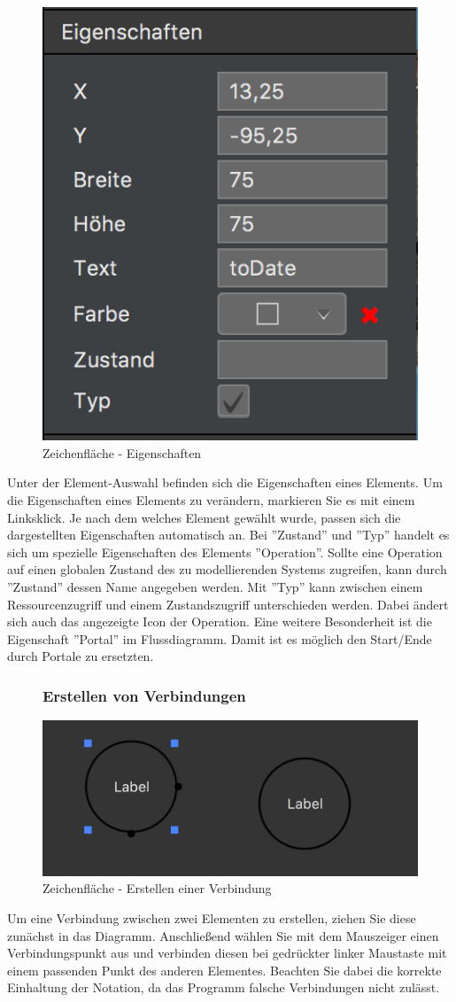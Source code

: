 \pagebreak
\begin{figure}[H]
	\centering
	\includegraphics[width=.4\textwidth]{Eigenschaften.png}
	\caption{Zeichenfläche - Eigenschaften}
\end{figure}
Unter der Element-Auswahl befinden sich die Eigenschaften eines Elements. Um die Eigenschaften eines Elements zu verändern, markieren Sie es mit einem Linksklick. Je nach dem welches Element gewählt wurde, passen sich die dargestellten Eigenschaften automatisch an. Bei ''Zustand'' und ''Typ'' handelt es sich um spezielle Eigenschaften des Elements ''Operation''. Sollte eine Operation auf einen globalen Zustand des zu modellierenden Systems zugreifen, kann durch ''Zustand'' dessen Name angegeben werden. Mit ''Typ'' kann zwischen einem Ressourcenzugriff und einem Zustandszugriff unterschieden werden. Dabei ändert sich auch das angezeigte Icon der Operation. Eine weitere Besonderheit ist die Eigenschaft ''Portal'' im Flussdiagramm. Damit ist es möglich den Start/Ende durch Portale zu ersetzten.

\begin{figure}[H]
\subsubsection{Erstellen von Verbindungen}
	\centering
	\includegraphics[width=.4\textwidth]{Zeichenflaeche_Basics.png}
	\caption{Zeichenfläche - Erstellen einer Verbindung}	
\end{figure}
Um eine Verbindung zwischen zwei Elementen zu erstellen, ziehen Sie diese zunächst in das Diagramm. Anschließend wählen Sie mit dem Mauszeiger einen Verbindungspunkt aus und verbinden diesen bei gedrückter linker Maustaste mit einem passenden Punkt des anderen Elementes. Beachten Sie dabei die korrekte Einhaltung der Notation, da das Programm falsche Verbindungen nicht zulässt. 

